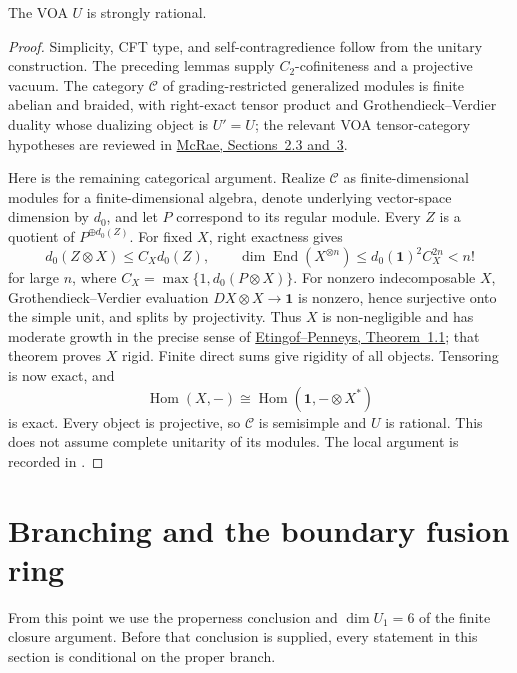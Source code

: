 \begin{proposition}
The VOA $U$ is strongly rational.
\end{proposition}
\begin{proof}
Simplicity, CFT type, and self-contragredience follow from the unitary
construction. The preceding lemmas supply $C_2$-cofiniteness and a
projective vacuum. The category $\mathcal C$ of grading-restricted
generalized modules is finite abelian and braided, with right-exact
tensor product and Grothendieck--Verdier duality whose dualizing object
is $U'=U$; the relevant VOA tensor-category hypotheses are reviewed in
\href{https://arxiv.org/html/2108.01898}{McRae, Sections~2.3 and~3}.

Here is the remaining categorical argument. Realize $\mathcal C$ as
finite-dimensional modules for a finite-dimensional algebra, denote
underlying vector-space dimension by $d_0$, and let $P$ correspond to
its regular module. Every $Z$ is a quotient of $P^{\oplus d_0(Z)}$.
For fixed $X$, right exactness gives
\[
 d_0(Z\otimes X)\le C_Xd_0(Z),\qquad
 \dim\operatorname{End}(X^{\otimes n})
 \le d_0(\mathbf1)^2C_X^{2n}<n!
\]
for large $n$, where $C_X=\max\{1,d_0(P\otimes X)\}$.
For nonzero indecomposable $X$, Grothendieck--Verdier evaluation
$DX\otimes X\to\mathbf1$ is nonzero, hence surjective onto the simple
unit, and splits by projectivity. Thus $X$ is non-negligible and has
moderate growth in the precise sense of
\href{https://arxiv.org/html/2412.17681v3}{Etingof--Penneys,
Theorem~1.1}; that theorem proves $X$ rigid. Finite direct sums give
rigidity of all objects. Tensoring is now exact, and
\[
 \operatorname{Hom}(X,-)
 \cong\operatorname{Hom}(\mathbf1,-\otimes X^*)
\]
is exact. Every object is projective, so $\mathcal C$ is semisimple and
$U$ is rational. This does not assume complete unitarity of its modules.
The local argument is recorded in
.
\end{proof}

\section{Branching and the boundary fusion ring}
\label{sec:branching}

From this point we use the properness conclusion and $\dim U_1=6$ of
the finite closure argument. Before that conclusion is supplied, every
statement in this section is conditional on the proper branch.

